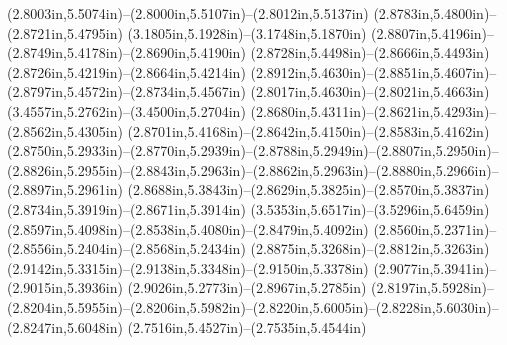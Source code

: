 (2.8003in,5.5074in)--(2.8000in,5.5107in)--(2.8012in,5.5137in) (2.8783in,5.4800in)--(2.8721in,5.4795in) (3.1805in,5.1928in)--(3.1748in,5.1870in) (2.8807in,5.4196in)--(2.8749in,5.4178in)--(2.8690in,5.4190in) (2.8728in,5.4498in)--(2.8666in,5.4493in) (2.8726in,5.4219in)--(2.8664in,5.4214in) (2.8912in,5.4630in)--(2.8851in,5.4607in)--(2.8797in,5.4572in)--(2.8734in,5.4567in) (2.8017in,5.4630in)--(2.8021in,5.4663in) (3.4557in,5.2762in)--(3.4500in,5.2704in) (2.8680in,5.4311in)--(2.8621in,5.4293in)--(2.8562in,5.4305in) (2.8701in,5.4168in)--(2.8642in,5.4150in)--(2.8583in,5.4162in) (2.8750in,5.2933in)--(2.8770in,5.2939in)--(2.8788in,5.2949in)--(2.8807in,5.2950in)--(2.8826in,5.2955in)--(2.8843in,5.2963in)--(2.8862in,5.2963in)--(2.8880in,5.2966in)--(2.8897in,5.2961in) (2.8688in,5.3843in)--(2.8629in,5.3825in)--(2.8570in,5.3837in) (2.8734in,5.3919in)--(2.8671in,5.3914in) (3.5353in,5.6517in)--(3.5296in,5.6459in) (2.8597in,5.4098in)--(2.8538in,5.4080in)--(2.8479in,5.4092in) (2.8560in,5.2371in)--(2.8556in,5.2404in)--(2.8568in,5.2434in) (2.8875in,5.3268in)--(2.8812in,5.3263in) (2.9142in,5.3315in)--(2.9138in,5.3348in)--(2.9150in,5.3378in) (2.9077in,5.3941in)--(2.9015in,5.3936in) (2.9026in,5.2773in)--(2.8967in,5.2785in) (2.8197in,5.5928in)--(2.8204in,5.5955in)--(2.8206in,5.5982in)--(2.8220in,5.6005in)--(2.8228in,5.6030in)--(2.8247in,5.6048in) (2.7516in,5.4527in)--(2.7535in,5.4544in)
